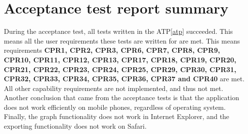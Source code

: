 \chapter{Acceptance test report summary}
\label{chap:testreports}

During the acceptance test, all tests written in the ATP\ref{atp} succeeded. This means all the user requirements these tests are written for are met. This means requirements \textbf{CPR1, CPR2, CPR3, CPR6, CPR7, CPR8, CPR9, CPR10, CPR11, CPR12, CPR13, CPR17, CPR18, CPR19, CPR20, CPR21, CPR22, CPR23, CPR24, CPR25, CPR29, CPR30, CPR31, CPR32, CPR33, CPR34, CPR35, CPR36, CPR37 and CPR40} are met. All other capability requirements are not implemented, and thus not met. Another conclusion that came from the acceptance tests is that the application does not work efficiently on mobile phones, regardless of operating system. Finally, the graph functionality does not work in Internet Explorer, and the exporting functionality does not work on Safari.
